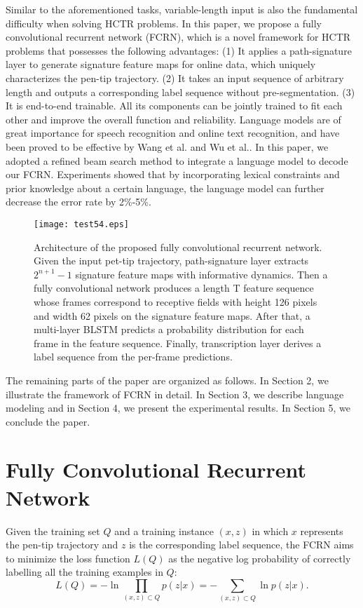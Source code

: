 \documentclass[10pt,conference,a4paper]{IEEEtran}
\begin{document}
Similar to the aforementioned tasks, variable-length input is also the fundamental difficulty when solving HCTR problems.
In this paper, we propose a fully convolutional recurrent network (FCRN), which is a novel framework for HCTR problems that possesses the following advantages:
(1) It applies a path-signature layer to generate signature feature maps for online data, which uniquely characterizes the pen-tip trajectory.
(2) It takes an input sequence of arbitrary length and outputs a corresponding label sequence without pre-segmentation.
(3) It is end-to-end trainable. All its components can be jointly trained to fit each other and improve the overall function and reliability.
Language models are of great importance for speech recognition and online text recognition, and have been proved to be effective by Wang et al.\cite{wang2012handwritten} and Wu et al.\cite{wu2015evaluation}.
In this paper, we adopted a refined beam search method to integrate a language model to decode our FCRN.
Experiments showed that by incorporating lexical constraints and prior knowledge about a certain language, the language model can further decrease the error rate by 2\%-5\%.
\begin{figure*}[th]
\centering
\texttt{[image: test54.eps]}
\caption{Architecture of the proposed fully convolutional recurrent network. Given the input pet-tip trajectory, path-signature layer extracts $2^{n+1}-1$ signature feature maps with informative dynamics. Then a fully convolutional network produces a length T feature sequence whose frames correspond to receptive fields with height 126 pixels and width 62 pixels on the signature feature maps.
After that, a multi-layer BLSTM predicts a probability distribution for each frame in the feature sequence. Finally, transcription layer derives a label sequence from the per-frame predictions.}
\label{FigureOverallSystem}
\end{figure*}


The remaining parts of the paper are organized as follows. In Section 2, we illustrate the framework of FCRN in detail. In Section 3, we describe language modeling and in Section 4, we present the experimental results. In Section 5, we conclude the paper.







\section{Fully Convolutional Recurrent Network}
Given the training set $Q$ and a training instance $(x,z)$ in which $x$ represents the pen-tip trajectory and $z$ is the corresponding label sequence, the FCRN aims to minimize the loss function $L(Q)$ as the negative log probability of correctly labelling all the training examples in $Q$:
\begin{equation}
    L(Q)=-\ln \prod_{(x,z)\subset Q} p(z|x) = - \sum_{(x,z)\subset Q} \ln p(z|x).
\end{equation}
\end{document}
